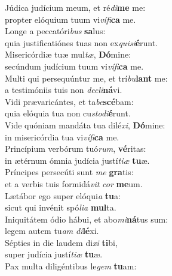 \evenverse Júdica judícium meum, et ré\textit{di}\textbf{me} me:~\*\\
\evenverse propter elóquium tuum vi\textit{ví}\textit{fi}\textbf{ca} me.\\
\oddverse Longe a peccatóri\textit{bus} \textbf{sa}lus:~\*\\
\oddverse quia justificatiónes tuas non ex\textit{qui}\textit{si}\textbf{é}runt.\\
\evenverse Misericórdiæ tuæ mul\textit{tæ}, \textbf{Dó}mine:~\*\\
\evenverse secúndum judícium tuum vi\textit{ví}\textit{fi}\textbf{ca} me.\\
\oddverse Multi qui persequúntur me, et trí\textit{bu}\textbf{lant} me:~\*\\
\oddverse a testimóniis tuis non \textit{de}\textit{cli}\textbf{ná}vi.\\
\evenverse Vidi prævaricántes, et ta\textit{be}\textbf{scé}bam:~\*\\
\evenverse quia elóquia tua non cu\textit{sto}\textit{di}\textbf{é}runt.\\
\oddverse Vide quóniam mandáta tua dilé\textit{xi}, \textbf{Dó}mine:~\*\\
\oddverse in misericórdia tua vi\textit{ví}\textit{fi}\textbf{ca} me.\\
\evenverse Princípium verbórum tuó\textit{rum}, \textbf{vé}ritas:~\*\\
\evenverse in ætérnum ómnia judícia justí\textit{ti}\textit{æ} \textbf{tu}æ.\\
\oddverse Príncipes persecúti sunt \textit{me} \textbf{gra}tis:~\*\\
\oddverse et a verbis tuis formidá\textit{vit} \textit{cor} \textbf{me}um.\\
\evenverse Lætábor ego super elóqui\textit{a} \textbf{tu}a:~\*\\
\evenverse sicut qui invénit spó\textit{li}\textit{a} \textbf{mul}ta.\\
\oddverse Iniquitátem ódio hábui, et abo\textit{mi}\textbf{ná}tus sum:~\*\\
\oddverse legem autem tu\textit{am} \textit{di}\textbf{lé}xi.\\
\evenverse Sépties in die laudem di\textit{xi} \textbf{ti}bi,~\*\\
\evenverse super judícia justí\textit{ti}\textit{æ} \textbf{tu}æ.\\
\oddverse Pax multa diligéntibus le\textit{gem} \textbf{tu}am:~\*\\
